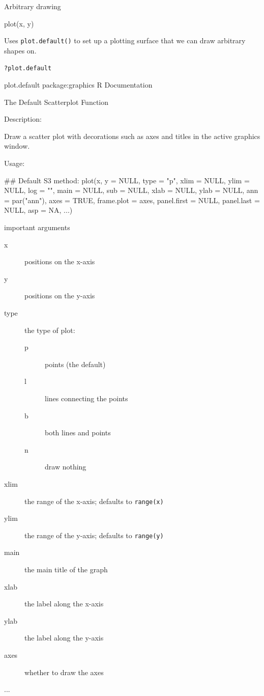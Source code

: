 \documentclass[pdf]{beamer}
\begin{document}
\begin{frame}[fragile]{Arbitrary drawing}
  
  \begin{rcode}
    plot(x, y)
  \end{rcode}

  {\small
  Uses \texttt{plot.default()} to set up a plotting surface that we can draw
  arbitrary shapes on.
  }

  \texttt{?plot.default}
  \begin{rcode}
    plot.default             package:graphics              R Documentation

    The Default Scatterplot Function

    Description:

     Draw a scatter plot with decorations such as axes and titles in
     the active graphics window.

    Usage:

     ## Default S3 method:
     plot(x, y = NULL, type = "p",  xlim = NULL, ylim = NULL,
          log = "", main = NULL, sub = NULL, xlab = NULL, ylab = NULL,
          ann = par("ann"), axes = TRUE, frame.plot = axes,
          panel.first = NULL, panel.last = NULL, asp = NA, ...)
  \end{rcode}
\end{frame}

\begin{frame}[fragile]{important arguments}

  {
    \small
  \begin{description}
    \item[x] positions on the x-axis
    \item[y] positions on the y-axis
    \item[type] the type of plot:
      \begin{description}
      \item[p] points (the default)
      \item[l] lines connecting the points
      \item[b] both lines and points
      \item[n] draw nothing
      \end{description}
    \item[xlim] the range of the x-axis; defaults to \texttt{range(x)}
    \item[ylim] the range of the y-axis; defaults to \texttt{range(y)}
    \item[main] the main title of the graph
    \item[xlab] the label along the x-axis
    \item[ylab] the label along the y-axis
    \item[axes] whether to draw the axes
    \item[...]
    \end{description}
    }
\end{frame}
\end{document}
